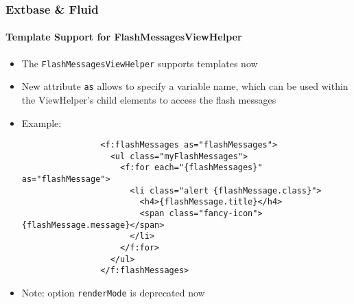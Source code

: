 
\begin{frame}[fragile]
	\frametitle{Extbase \& Fluid}
	\framesubtitle{Template Support for FlashMessagesViewHelper}

	\lstset{basicstyle=\tiny\ttfamily}

	\begin{itemize}

		\item The \texttt{FlashMessagesViewHelper} supports templates now

		\item New attribute \texttt{as} allows to specify a variable name, which can be
			used within the ViewHelper's child elements to access the flash messages

		\item Example:

			\begin{lstlisting}
				<f:flashMessages as="flashMessages">
				  <ul class="myFlashMessages">
				    <f:for each="{flashMessages}" as="flashMessage">
				      <li class="alert {flashMessage.class}">
				        <h4>{flashMessage.title}</h4>
				        <span class="fancy-icon">{flashMessage.message}</span>
				      </li>
				    </f:for>
				  </ul>
				</f:flashMessages>
			\end{lstlisting}

		\item Note: option \texttt{renderMode} is deprecated now

	\end{itemize}

\end{frame}


